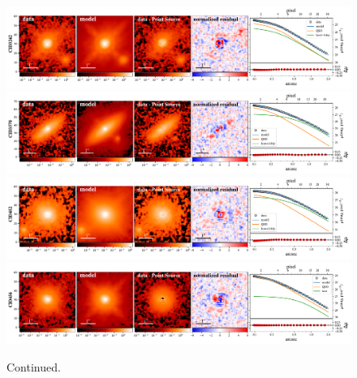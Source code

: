 \documentclass[apj]{emulateapj}
\begin{document}
\begin{figure}
{{%
}}
\end{figure} 

\begin{figure}
\centering
{
\includegraphics[height=0.25\textwidth]{fig/best_fit_CID3242_SB_profile.pdf}
\includegraphics[height=0.25\textwidth]{fig/best_fit_CID3570_SB_profile.pdf}
\includegraphics[height=0.25\textwidth]{fig/best_fit_CID452_SB_profile.pdf}
\includegraphics[height=0.25\textwidth]{fig/best_fit_CID454_SB_profile.pdf}
}
\caption{Continued.}
\end{figure} 
\end{document}
